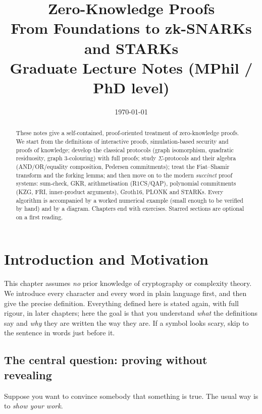 \documentclass[11pt,a4paper]{report}
\title{\Huge\bfseries Zero-Knowledge Proofs\\[4pt]\Large From Foundations to zk-SNARKs and STARKs\\[10pt]
\large Graduate Lecture Notes (MPhil / PhD level)}
\author{}
\date{\today}
\theoremstyle{plain}
\theoremstyle{definition}
\theoremstyle{remark}
\begin{document}
\maketitle
\begin{abstract}\noindent
These notes give a self-contained, proof-oriented treatment of zero-knowledge proofs.
We start from the definitions of interactive proofs, simulation-based security and proofs of knowledge;
develop the classical protocols (graph isomorphism, quadratic residuosity, graph 3-colouring) with full
proofs; study $\Sigma$-protocols and their algebra (AND/OR/equality composition, Pedersen commitments);
treat the Fiat--Shamir transform and the forking lemma; and then move on to the modern
\emph{succinct} proof systems: sum-check, GKR, arithmetisation (R1CS/QAP), polynomial commitments
(KZG, FRI, inner-product arguments), Groth16, PLONK and STARKs. Every algorithm is accompanied by a
worked numerical example (small enough to be verified by hand) and by a diagram.
Chapters end with exercises. Starred sections are optional on a first reading.
\end{abstract}
\tableofcontents
\clearpage{}

\chapter{Introduction and Motivation}\label{ch:intro}

\begin{intuition}
This chapter assumes \emph{no} prior knowledge of cryptography or complexity theory. We introduce every character
and every word in plain language first, and then give the precise definition. Everything defined here is stated
again, with full rigour, in later chapters; here the goal is that you understand \emph{what} the definitions say and \emph{why}
they are written the way they are. If a symbol looks scary, skip to the sentence in words just before it.
\end{intuition}

\section{The central question: proving without revealing}
Suppose you want to convince somebody that something is true. The usual way is to \emph{show your work}.
\end{document}

